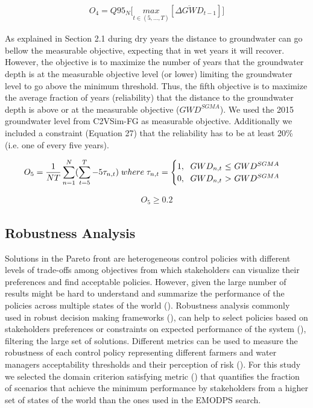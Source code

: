 \documentclass[11pt,a4paper]{article}
\begin{document}
\begin{align}
O_{4} = Q95_{N} \bigg[\underset{t\in(5,...,T)}{max}[\overline{\Delta GWD}_{t-1}]\bigg]
\end{align}

As explained in Section 2.1 during dry years the distance to groundwater can go bellow the measurable objective, expecting that in wet years it will recover. However, the objective is to maximize the number of years that the groundwater depth is at the measurable objective level (or lower) limiting the groundwater level to go above the minimum threshold. Thus, the fifth objective is to maximize the average fraction of years (reliability) that the distance to the groundwater depth is above or at the measurable objective ($GWD^{SGMA}$).  We used the 2015 groundwater level from C2VSim-FG as measurable objective. Additionally we included a constraint (Equation 27) that the reliability has to be at least 20\% (i.e. one of every five years). 

\begin{align}
O_{5} = \frac{1}{NT}\sum_{n=1}^N(\sum_{t=5}^T-5 \tau_{n,t})\; where\; \tau_{n,t} = \begin{cases}
      1, \text{\; $GWD_{n,t}$  $\leq$ $GWD^{SGMA}$}\\
      0, \text{\; $GWD_{n,t}$ $>$ $GWD^{SGMA}$}\\
\end{cases}      
\end{align}


\begin{align}
O_{5} \geq 0.2
\end{align}

\subsection{Robustness Analysis}

Solutions in the Pareto front are heterogeneous control policies with different levels of trade-offs among objectives from which stakeholders can visualize their preferences and find acceptable policies. However, given the large number of results might be hard to understand and summarize the performance of the policies across multiple states of the world (\cite{herman_how_2015}). Robustness analysis commonly used in robust decision making frameworks (\cite{marchau_decision_2019}), can help to select policies based on stakeholders preferences or constraints on expected performance of the system (\cite{kasprzyk_many_2013}), filtering the large set of solutions. Different metrics can be used to measure the robustness of each control policy representing different farmers and water managers acceptability thresholds and their perception of risk (\cite{mcphail_robustness_2018}). For this study we selected the domain criterion satisfying metric (\cite{schneller_decision_1983}) that quantifies the fraction of scenarios that achieve the minimum performance by stakeholders from a higher set of states of the world than the ones used in the EMODPS search. 
\end{document}
